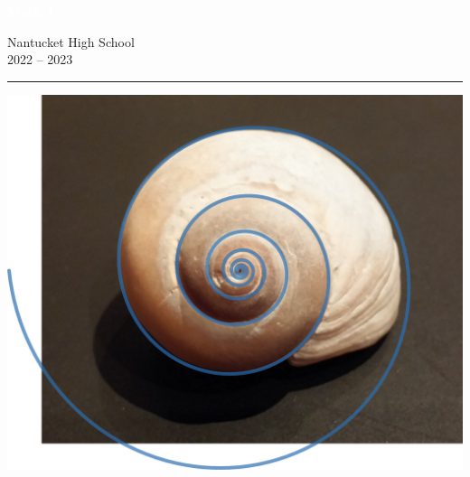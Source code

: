 \documentclass{tstextbook}
\begin{document}
\begin{titlepage}
\BgThispage
{}
\vspace*{0.4\textheight}
\noindent
\textcolor{white}{\Huge\textbf{\textsf{Math 1}}}
\vspace*{2cm}\par
\noindent
\begin{minipage}{0.35\linewidth}
    \begin{flushright}
    Nantucket High School \\
    2022 -- 2023
    \end{flushright}
\end{minipage} \hspace{15pt}
%
\begin{minipage}{0.02\linewidth}
    \rule{1pt}{175pt}
\end{minipage} \hspace{-10pt}
%
\begin{minipage}{0.63\linewidth}
\vspace{5pt}
%  
\hspace{35mm}
\includegraphics[width=1.0\textwidth]{img/shell.png}
\end{minipage}
\end{titlepage}

\newpage

\end{document}
